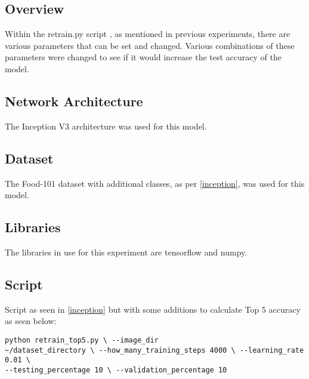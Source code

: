 \subsection*{Overview}
Within the retrain.py script \parencite{retrainInception}, as mentioned in
previous experiments, there are various parameters that can be set and changed.
Various combinations of these parameters were changed to see if it would increase the
test accuracy of the model.

\subsection*{Network Architecture}
The Inception V3 architecture was used for this model.

\subsection*{Dataset}
The Food-101 dataset \parencite{food101} with additional classes, as per
\ref{inception}, was used for this model.

\subsection*{Libraries}
The libraries in use for this experiment are tensorflow and numpy.

\subsection*{Script}
Script as seen in \ref{inception} but with some additions to calculate Top 5 accuracy as seen
below:

\begin{lstlisting}
python retrain_top5.py \ --image_dir
~/dataset_directory \ --how_many_training_steps 4000 \ --learning_rate 0.01 \
--testing_percentage 10 \ --validation_percentage 10
\end{lstlisting}

